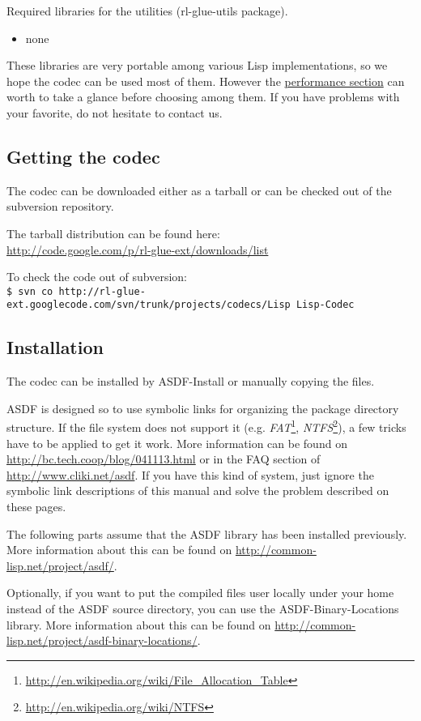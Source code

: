 \documentclass[11pt,a4paper,dvipdfm]{article}
\newcommand{\selfref}[1]{\href{#1}{#1}}
\newcommand{\footref}[2]{\textsl{#1}\footnote{\selfref{#2}}}
\newcommand{\prompttext}[1]{\texttt{#1}}
\newcommand{\shprompt}[1]{\prompttext{\$ #1}}
\begin{document}
Required libraries for the utilities (rl-glue-utils package).
\begin{itemize}
\item[] none
\end{itemize}

These libraries are very portable among various Lisp implementations, so we
hope the codec can be used most of them. However the
\hyperlink{perfmeas}{performance section} can worth to take a
glance before choosing among them. If you have problems with your favorite,
do not hesitate to contact us.

\subsection{Getting the codec}

The codec can be downloaded either as a tarball or can be checked out of the
subversion repository.

The tarball distribution can be found here: \\
\selfref{http://code.google.com/p/rl-glue-ext/downloads/list}

To check the code out of subversion: \\
\shprompt{svn co
          http://rl-glue-ext.googlecode.com/svn/trunk/projects/codecs/Lisp
          Lisp-Codec}

\subsection{Installation}

The codec can be installed by ASDF-Install or manually copying the files.

ASDF is designed so to use symbolic links for organizing the package directory
structure. If the file system does not support it (e.g.
\footref{FAT}{http://en.wikipedia.org/wiki/File\_Allocation\_Table},
\footref{NTFS}{http://en.wikipedia.org/wiki/NTFS}), a few
tricks have to be applied to get it work. More information can be
found on \selfref{http://bc.tech.coop/blog/041113.html} or in the FAQ section
of \selfref{http://www.cliki.net/asdf}. If you have this kind of system, just
ignore the symbolic link descriptions of this manual and solve the problem
described on these pages.

The following parts assume that the ASDF library has been installed
previously. More information about this can be found on
\selfref{http://common-lisp.net/project/asdf/}.

Optionally, if you want to put the compiled files user locally under your
home instead of the ASDF source directory, you can use the
ASDF-Binary-Locations library. More information about this can be found on
\selfref{http://common-lisp.net/project/asdf-binary-locations/}.
\end{document}
